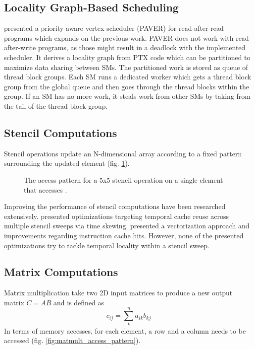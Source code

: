 \documentclass{article}
\newcommand{\TODO}[1]{\noindent{\color{red}\textbf{[TODO] #1}}}
\begin{document}
\subsection{Locality Graph-Based Scheduling}
\citet{tripathy2021paver} presented a priority aware vertex scheduler (PAVER) for read-after-read programs which expands on the previous work.
PAVER does not work with read-after-write programs, as those might result in a deadlock with the implemented scheduler.
It derives a locality graph from PTX code which can be partitioned to maximize data sharing between SMs.
The partitioned work is stored as queue of thread block groups.
Each SM runs a dedicated worker which gets a thread block group from the global queue and then goes through the thread blocks within the group.
If an SM has no more work, it steals work from other SMs by taking from the tail of the thread block group.

\subsection{Stencil Computations}
Stencil operations update an N-dimensional array according to a fixed pattern surrounding the updated element (fig. \ref{fig:stencil_access_pattern}).

\begin{figure}[H]
    \centering
    \caption{
        The access pattern for a 5x5 stencil operation on a single element  that accesses .
    }
    \label{fig:stencil_access_pattern}
\end{figure}

Improving the performance of stencil computations have been researched extensively.
\citet{kamil2006implicit} presented optimizations targeting temporal cache reuse across multiple stencil sweeps via time skewing.
\citet{zhao2019exploiting} presented a vectorization approach and improvements regarding instruction cache hits.
However, none of the presented optimizations try to tackle temporal locality within a stencil sweep.
\TODO{Expand on this}

\subsection{Matrix Computations}
\label{sec:matrix_intro}
Matrix multiplication take two 2D input matrices to produce a new output matrix $C = AB$ and is defined as
\[
    c_{ij} = \sum^n_k{a_{ik}b_{kj}}
\]
In terms of memory accesses, for each element, a row and a column needs to be accessed (fig. \ref{fig:matmult_access_pattern}).
\end{document}
